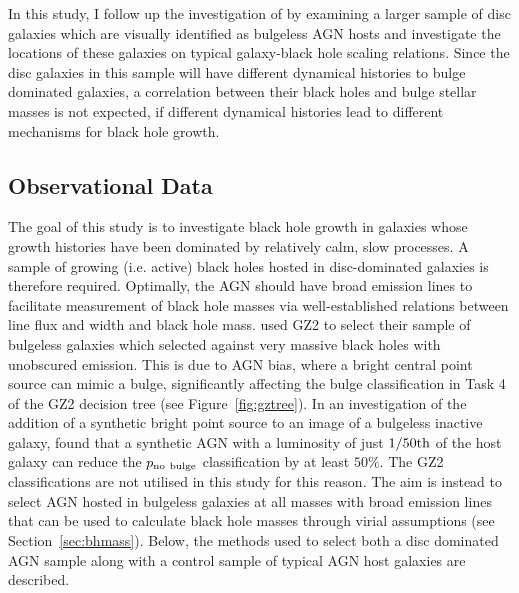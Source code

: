 In this study, I follow up the investigation of \citeauthor{Simmons13} by examining a larger sample of disc galaxies which are visually identified as bulgeless AGN hosts and investigate the locations of these galaxies on typical galaxy-black hole scaling relations. Since the disc galaxies in this sample will have different dynamical histories to bulge dominated galaxies, a correlation between their black holes and bulge stellar masses is not expected, if different dynamical histories lead to different mechanisms for black hole growth. 



%
%
\subsection{Observational Data}\label{sec:data}
%
%

The goal of this study is to investigate black hole growth in galaxies whose growth histories have been dominated by relatively calm, slow processes. A sample of growing (i.e. active) black holes hosted in disc-dominated galaxies is therefore required. Optimally, the AGN should have broad emission lines to facilitate measurement of black hole masses via well-established relations between line flux and width and black hole mass. \citeauthor{Simmons13} used GZ2 to select their sample of bulgeless galaxies which selected against very massive black holes with unobscured emission. This is due to AGN bias, where a bright central point source can mimic a bulge, significantly affecting the bulge classification in Task 4 of the GZ2 decision tree (see Figure~\ref{fig:gztree}). In an investigation of the addition of a synthetic bright point source to an image of a bulgeless inactive galaxy, \citeauthor{Simmons13} found that a synthetic AGN with a luminosity of just $1/50\rm{th}$ of the host galaxy can reduce the $p_{\rm{no}~\rm{bulge}}$ classification by at least $50\%$. The GZ2 classifications are not utilised in this study for this reason. The aim is instead to select AGN hosted in bulgeless galaxies at all masses with broad emission lines that can be used to calculate black hole masses through virial assumptions (see Section~\ref{sec:bhmass}). Below, the methods used to select both a disc dominated AGN sample along with a control sample of typical AGN host galaxies are described.


